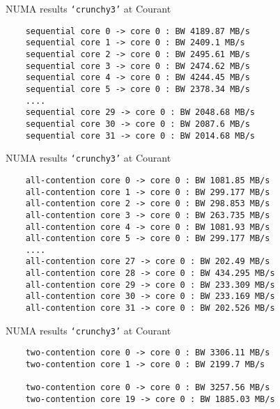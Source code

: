 \documentclass[english,compress]{beamer}
\begin{document}
\begin{frame}[fragile]{NUMA results}
  \texttt{`crunchy3'} at Courant

  \medskip
  \begin{lstlisting}
    sequential core 0 -> core 0 : BW 4189.87 MB/s
    sequential core 1 -> core 0 : BW 2409.1 MB/s
    sequential core 2 -> core 0 : BW 2495.61 MB/s
    sequential core 3 -> core 0 : BW 2474.62 MB/s
    sequential core 4 -> core 0 : BW 4244.45 MB/s
    sequential core 5 -> core 0 : BW 2378.34 MB/s
    ....
    sequential core 29 -> core 0 : BW 2048.68 MB/s
    sequential core 30 -> core 0 : BW 2087.6 MB/s
    sequential core 31 -> core 0 : BW 2014.68 MB/s
  \end{lstlisting}
\end{frame}
\begin{frame}[fragile]{NUMA results}
  \texttt{`crunchy3'} at Courant

  \medskip
  \begin{lstlisting}
    all-contention core 0 -> core 0 : BW 1081.85 MB/s
    all-contention core 1 -> core 0 : BW 299.177 MB/s
    all-contention core 2 -> core 0 : BW 298.853 MB/s
    all-contention core 3 -> core 0 : BW 263.735 MB/s
    all-contention core 4 -> core 0 : BW 1081.93 MB/s
    all-contention core 5 -> core 0 : BW 299.177 MB/s
    ....
    all-contention core 27 -> core 0 : BW 202.49 MB/s
    all-contention core 28 -> core 0 : BW 434.295 MB/s
    all-contention core 29 -> core 0 : BW 233.309 MB/s
    all-contention core 30 -> core 0 : BW 233.169 MB/s
    all-contention core 31 -> core 0 : BW 202.526 MB/s
  \end{lstlisting}
\end{frame}
\begin{frame}[fragile]{NUMA results}
  \texttt{`crunchy3'} at Courant

  \medskip
  \begin{lstlisting}
    two-contention core 0 -> core 0 : BW 3306.11 MB/s
    two-contention core 1 -> core 0 : BW 2199.7 MB/s

    two-contention core 0 -> core 0 : BW 3257.56 MB/s
    two-contention core 19 -> core 0 : BW 1885.03 MB/s
  \end{lstlisting}
\end{frame}
\end{document}
